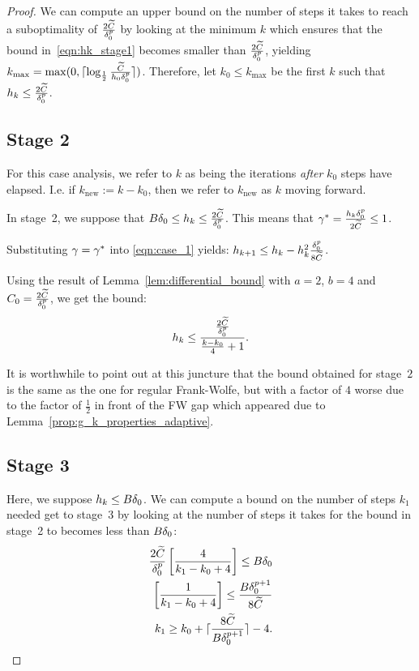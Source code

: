 \begin{proof}
	We can compute an upper bound on the number of steps it takes to reach a suboptimality of $\frac{2\widetilde{C}}{\delta_0^p}$ by looking at the minimum $k$ which ensures that the bound in~\eqref{eqn:hk_stage1} becomes smaller than $\frac{2\widetilde{C}}{\delta_0^p}$, yielding
	$k_{\max} = \max(0,\lceil\log_{\frac{1}{2}}\frac{\widetilde{C}}{h_0\delta_0^p}\rceil)$. Therefore, let $k_0\leq k_{\max}$ be the 
	first $k$ such that $h_k\leq\frac{2\widetilde{C}}{\delta_0^p}$.

	\subsection*{Stage 2}
	For this case analysis, we refer to $k$ as being the iterations \emph{after} $k_0$ steps have elapsed. I.e. if $k_{\mathrm{new}} := k-k_0$, then we refer to $k_{\mathrm{new}}$ as $k$ moving forward. 
	
	In stage~2, we suppose that $B\delta_0\leq h_k\leq\frac{2\widetilde{C}}{\delta_0^p}$. This means that $\gamma^* = \frac{h_k\delta_0^p}{2\widetilde{C}}\leq 1$.
	
	Substituting $\gamma=\gamma^*$ into \eqref{eqn:case_1} yields: $h_{k+1}\leq h_k -h_k^2\frac{\delta_0^p}{8\widetilde{C}}$.

	Using the result of Lemma~\ref{lem:differential_bound} with $a=2$, $b=4$ and $C_0 = \frac{2\widetilde{C}}{\delta_0^p}$, we get the bound:	
	$$h_k\leq\frac{\frac{2\widetilde{C}}{\delta_0^p}}{\frac{k-k_0}{4}+1}.$$
	
	It is worthwhile to point out at this juncture that the bound obtained for stage~$2$ is the same as the one for regular Frank-Wolfe, but with a factor of $4$ worse due to the factor of $\frac{1}{2}$ in front of the FW gap which appeared due to Lemma~\ref{prop:g_k_properties_adaptive}.

	\subsection*{Stage 3}
	Here, we suppose $h_k\leq B\delta_0$. We can compute a bound on the number of steps $k_1$ needed get to stage~3 by looking at the number of steps it takes for the bound in stage~2 to becomes less than $B\delta_0$:
	\begin{equation*}
		\begin{split}
		\frac{2\widetilde{C}}{\delta_0^p} \left[\frac{4}{k_1-k_0+4}\right] \leq B\delta_0\\
		\left[\frac{1}{k_1-k_0+4}\right] \leq \frac{B\delta_0^{p+1}}{8\widetilde{C}}\\
		k_1 \geq k_0 + \lceil\frac{8\widetilde{C}}{B\delta_0^{p+1}}\rceil - 4.
		\end{split}
	\end{equation*}


\end{proof}
